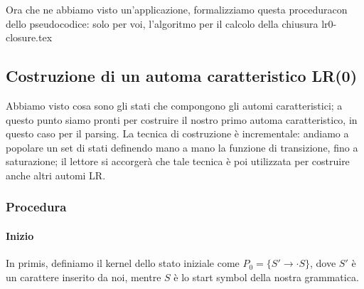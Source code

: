 \documentclass[class=book, crop=false, oneside, 12pt]{standalone}
\begin{document}
Ora che ne abbiamo visto un'applicazione, formalizziamo questa proceduracon dello pseudocodice: solo per voi, l'algoritmo per il calcolo della chiusura
{lr0-closure.tex}

\subsection{Costruzione di un automa caratteristico LR(0)}
Abbiamo visto cosa sono gli stati che compongono gli automi caratteristici; a questo punto siamo pronti per costruire il nostro primo automa caratteristico,  in questo caso per il parsing. La tecnica di costruzione è incrementale: andiamo a popolare un set di stati definendo mano a mano la funzione di transizione, fino a saturazione; il lettore si accorgerà che tale tecnica è poi utilizzata per costruire anche altri automi LR.

\subsubsection{Procedura}
\paragraph{Inizio}
In primis, definiamo il kernel dello stato iniziale come \(P_0 = \{S' \to \cdot S\}\), dove \(S'\) è un carattere inserito da noi, mentre \(S\) è lo start symbol della nostra grammatica.
\end{document}
